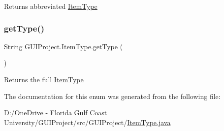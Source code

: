 \begin{DoxyReturn}{Returns}
abbreviated \mbox{\hyperlink{enum_g_u_i_project_1_1_item_type}{Item\+Type}} 
\end{DoxyReturn}
\mbox{\label{enum_g_u_i_project_1_1_item_type_a6e06aefe696a559d723840adc3b167c5}} 
\subsubsection{\texorpdfstring{getType()}{getType()}}
{\footnotesize\ttfamily String G\+U\+I\+Project.\+Item\+Type.\+get\+Type (\begin{DoxyParamCaption}{ }\end{DoxyParamCaption})}

\begin{DoxyReturn}{Returns}
the full \mbox{\hyperlink{enum_g_u_i_project_1_1_item_type}{Item\+Type}} 
\end{DoxyReturn}


The documentation for this enum was generated from the following file\+:\begin{DoxyCompactItemize}
\item 
D\+:/\+One\+Drive -\/ Florida Gulf Coast University/\+G\+U\+I\+Project/src/\+G\+U\+I\+Project/\mbox{\hyperlink{_item_type_8java}{Item\+Type.\+java}}\end{DoxyCompactItemize}
